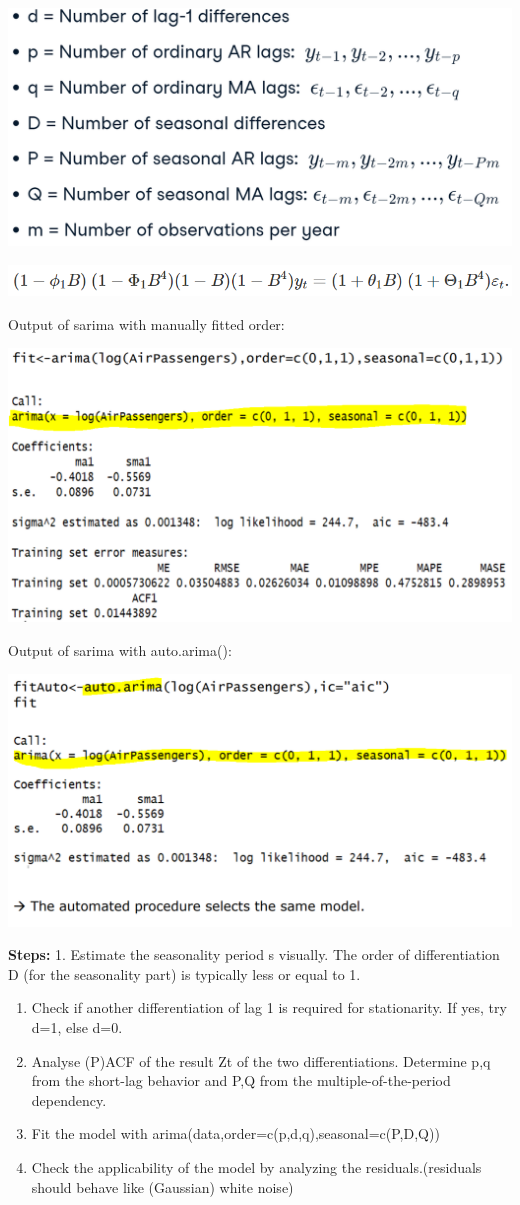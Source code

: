 \documentclass[
]{article}
\begin{document}
\includegraphics[width=0.5\linewidth]{sar}

\includegraphics[width=0.5\linewidth]{sarima1}

Output of sarima with manually fitted order:

\includegraphics[width=1\linewidth]{sarout}

Output of sarima with auto.arima():

\includegraphics[width=1\linewidth]{sarout1}

\textbf{Steps:} 1. Estimate the seasonality period s visually. The order
of differentiation D (for the seasonality part) is typically less or
equal to 1.

\begin{enumerate}
\def\labelenumi{\arabic{enumi}.}
\setcounter{enumi}{1}
\item
  Check if another differentiation of lag 1 is required for
  stationarity. If yes, try d=1, else d=0.
\item
  Analyse (P)ACF of the result Zt of the two differentiations. Determine
  p,q from the short-lag behavior and P,Q from the
  multiple-of-the-period dependency.
\item
  Fit the model with arima(data,order=c(p,d,q),seasonal=c(P,D,Q))
\item
  Check the applicability of the model by analyzing the
  residuals.(residuals should behave like (Gaussian) white noise)
\end{enumerate}
\end{document}
